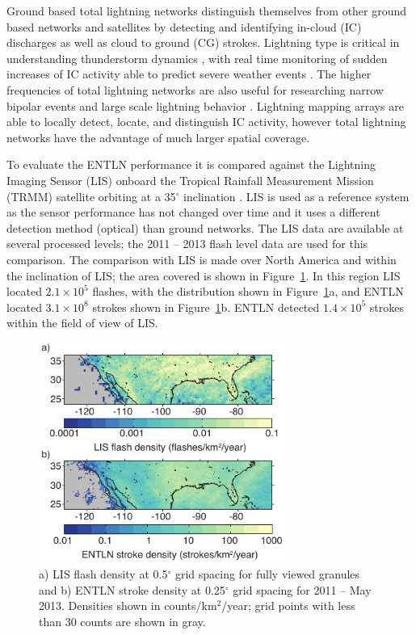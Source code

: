 Ground based total lightning networks distinguish themselves from other ground based networks and satellites by detecting and identifying in-cloud (IC) discharges as well as cloud to ground (CG) strokes.
Lightning type is critical in understanding thunderstorm dynamics \citep{Williams1989}, with real time monitoring of sudden increases of IC activity able to predict severe weather events \citep{Rudlosky2013, Darden2010, Metzger2013, Schultz2009, Schultz2011}.
The higher frequencies of total lightning networks are also useful for researching narrow bipolar events \citep{Suszcynsky2003} and large scale lightning behavior \citep{Hutchins2013}.
Lightning mapping arrays are able to locally detect, locate, and distinguish IC activity, however total lightning networks have the advantage of much larger spatial coverage.

To evaluate the ENTLN performance it is compared against the Lightning Imaging Sensor (LIS) onboard the Tropical Rainfall Measurement Mission (TRMM) satellite orbiting at a 35$^\circ$ inclination \citep{Christian1999}.
LIS is used as a reference system as the sensor performance has not changed over time and it uses a different detection method (optical) than ground networks. 
The LIS data are available at several processed levels; the 2011 -- 2013 flash level data are used for this comparison.
The comparison with LIS is made over North America and within the inclination of LIS; the area covered is shown in Figure~\ref{entln_lis:fig:density}.
In this region LIS located $2.1\times10^5$ flashes, with the distribution shown in Figure~\ref{entln_lis:fig:density}a, and ENTLN located $3.1\times10^8$ strokes shown in Figure~\ref{entln_lis:fig:density}b.
ENTLN detected $1.4\times10^5$ strokes within the field of view of LIS.

\begin{figure}[t]
   \centering
   \noindent\includegraphics[width=19pc,angle=0]{entln_lis/Figures/density.pdf}
   \caption{a) LIS flash density at 0.5$^\circ$ grid spacing for fully viewed granules and
   		b) ENTLN stroke density at 0.25$^\circ$ grid spacing for 2011 -- May 2013.
   		Densities shown in counts/km$^2$/year; grid points with less than 30 counts are shown in gray.}
   \label{entln_lis:fig:density}
\end{figure}

